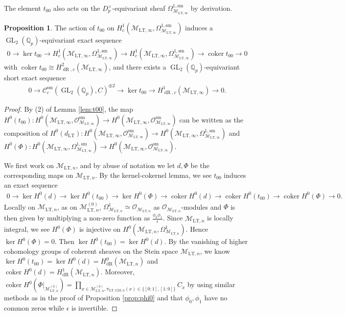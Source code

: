 \documentclass{article}
\theoremstyle{definition}
\newtheorem{proposition}[theorem]{Proposition}
\def\calC{\mathcal{C}}
\def\calM{\mathcal{M}}
\def\calO{\mathcal{O}}
\def\bbQ{\mathbb{Q}}
\def\isom{\cong}
\DeclareMathOperator{\coker}{coker}
\DeclareMathOperator{\GL}{GL}
\DeclareMathOperator{\dR}{dR}
\def\LT{\mathrm{LT}}
\def\sm{\mathrm{sm}}
\def\GM{\mathrm{GM}}
\begin{document}
The element $t_{00}$ also acts on the $D_{p}^{\times}$-equivariant sheaf $\Omega^{1,\sm}_{\calM_{\LT,\infty}}$ by derivation. 
\begin{proposition}\label{prop:t00}
The action of $t_{00}$ on $H^1_c(\calM_{\LT,\infty},\Omega_{\calM_{\LT,\infty}}^{1,\sm})$ induces a $\GL_2(\bbQ_p)$-equivariant exact sequence 
\begin{align*}
    0\to \ker t_{00}\to H^1_c(\calM_{\LT,\infty},\Omega_{\calM_{\LT,\infty}}^{1,\sm})\to H^1_c(\calM_{\LT,\infty},\Omega_{\calM_{\LT,\infty}}^{1,\sm})\to \coker t_{00}\to 0
\end{align*}
with $\coker t_{00}\isom H^2_{\dR,c}(\calM_{\LT,\infty})$, and there exists a $\GL_2(\bbQ_p)$-equivariant short exact sequence
\begin{align*}
    0\to \calC^\sm_c(\GL_2(\bbQ_p),C)^{\oplus 2}\to \ker t_{00}\to H^1_{\dR,c}(\calM_{\LT,\infty})\to 0.
\end{align*}
\begin{proof}
By (2) of Lemma \ref{lem:t00}, the map $H^0(t_{00}):H^0(\calM_{\LT,\infty},\calO_{\calM_{\LT,\infty}}^{\sm})\to H^0(\calM_{\LT,\infty},\calO_{\calM_{\LT,\infty}}^{\sm})$ can be written as the composition of $H^0(d_{\LT}):H^0(\calM_{\LT,\infty},\calO_{\calM_{\LT,\infty}}^{\sm})\rightarrow H^0(\calM_{\LT,\infty},\Omega^{1,\sm}_{\calM_{\LT,\infty}})$ and $H^0(\Phi): H^0(\calM_{\LT,\infty},\Omega^{1,\sm}_{\calM_{\LT,\infty}})\rightarrow H^0(\calM_{\LT,\infty},\calO_{\calM_{\LT,\infty}}^{\sm})$. 

We first work on $\calM_{\LT,n}$, and by abuse of notation we let $d,\Phi$ be the corresponding maps on $\calM_{\LT,n}$. By the kernel-cokernel lemma, we see $t_{00}$ induces an exact sequence
\begin{align}\label{equationkernelcokernel}
    0\to \ker H^0(d)\to \ker H^0(t_{00})\to \ker H^0(\Phi)\to \coker H^0(d)\to \coker H^0(t_{00})\to \coker H^0(\Phi)\to 0.
\end{align}
Locally on $\calM_{\LT,n}$, as on $\calM_{\LT,n}^{(0)}$, $\Omega_{\calM_{\LT,n}}^1\simeq \calO_{\calM_{\LT,n}}$ as $\calO_{\calM_{\LT,n}}$-modules and $\Phi$ is then given by multiplying a non-zero function as $\frac{\phi_0\phi_1}{\epsilon}$. Since $\calM_{\LT,n}$ is locally integral, we see $H^0(\Phi)$ is injective on $H^0(\calM_{\LT,n},\Omega^{1}_{\calM_{\LT,n}})$. Hence $\ker H^0(\Phi)=0$. Then $\ker H^0(t_{00})=\ker H^0(d)$. By the vanishing of higher cohomology groups of coherent sheaves on the Stein space $\calM_{\LT,n}$, we know $\ker H^0(t_{00})=\ker H^0(d)=H^0_{\dR}(\calM_{\LT,n})$ and $\coker H^0(d)=H^1_{\dR}(\calM_{\LT,n})$. Moreover, $\coker H^0(\Phi|_{\calM_{\LT,n}^{(0)}})=\prod_{x\in \calM_{\LT,n}^{(0)},\pi_{\LT,\GM,n}(x)\in\{[0:1],[1:0]\}}C_x$ by using similar methods as in the proof of Proposition \ref{prop:phi0} and that $\phi_0,\phi_1$ have no common zeros while $\epsilon$ is invertible. 


\end{proof}
\end{proposition}
\end{document}
